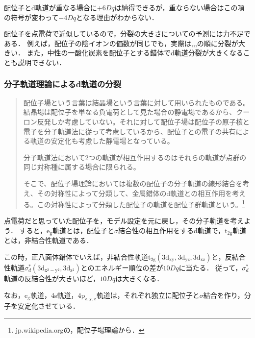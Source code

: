 \documentclass[uplatex, dvipdfmx]{jsreport}
\begin{document}
\begin{remark}
    配位子とd軌道が重なる場合に$+6Dq$は納得できるが，重ならない場合はこの項の符号が変わって$-4Dq$となる理由がわからない．
\end{remark}
\begin{anomaly}
    配位子を点電荷で近似しているので，分裂の大きさについての予測には力不足である．
    例えば，配位子の陰イオンの価数が同じでも，実際は,,,の順に分裂が大きい．
    また，中性の一酸化炭素を配位子とする錯体でd軌道分裂が大きくなることも説明できない．
\end{anomaly}


\subsubsection{分子軌道理論によるd軌道の分裂}

\begin{quotation}
    配位子場という言葉は結晶場という言葉に対して用いられたものである。結晶場は配位子を単なる負電荷として見た場合の静電場であるから、クーロン反発しか考慮していない。それに対して配位子場は配位子の原子核と電子を分子軌道法に従って考慮しているから、配位子との電子の共有による軌道の安定化も考慮した静電場となっている。
    
    分子軌道法において2つの軌道が相互作用するのはそれらの軌道が点群の同じ対称種に属する場合に限られる。
    
    そこで、配位子場理論においては複数の配位子の分子軌道の線形結合を考え、その対称性によって分類して、金属錯体のd軌道との相互作用を考える。この対称性によって分類した配位子の軌道を配位子群軌道という。\footnote{jp.wikipedia.orgの，配位子場理論から．}
\end{quotation}

\begin{theory}
    点電荷だと思っていた配位子を，モデル設定を元に戻し，その分子軌道を考えよう．
    すると，$\mathrm{e_g}$軌道とは，配位子と$\sigma$結合性の相互作用をするd軌道で，$\mathrm{t_{2g}}$軌道とは，非結合性軌道である．

    この時，正八面体錯体でいえば，非結合性軌道$\mathrm{t_{2g}}(\mathrm{3d_{xy},3d_{yz},3d_{xz}})$と，反結合性軌道$\sigma_d^*(\mathrm{3d_{x^2-y^2},3d_{z^2}})$とのエネルギー順位の差が$10Dq$に当たる．
    従って，$\sigma_d^*$軌道の反結合性が大きいほど，$10Dq$は大きくなる．

    なお，$\mathrm{e_g}$軌道，4s軌道，$\mathrm{4p_{z,y,z}}$軌道は，それぞれ独立に配位子と$\sigma$結合を作り，分子を安定化させている．
\end{theory}
\end{document}

